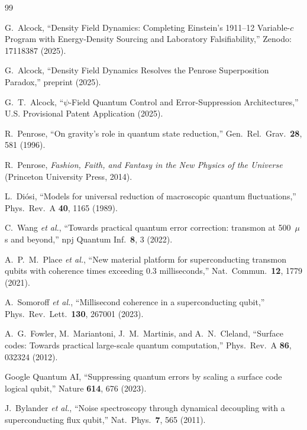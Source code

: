 \documentclass[aps,prd,twocolumn,superscriptaddress,nofootinbib]{revtex4-2}
\begin{document}
\begin{thebibliography}{99}

G.~Alcock, ``Density Field Dynamics: Completing Einstein's 1911--12
Variable-$c$ Program with Energy-Density Sourcing and Laboratory
Falsifiability,'' Zenodo: 17118387 (2025).

G.~Alcock, ``Density Field Dynamics Resolves the Penrose Superposition
Paradox,'' preprint (2025).

G.~T.~Alcock, ``$\psi$-Field Quantum Control and Error-Suppression
Architectures,'' U.S. Provisional Patent Application (2025).

R.~Penrose, ``On gravity's role in quantum state reduction,''
Gen.\ Rel.\ Grav.\ \textbf{28}, 581 (1996).

R.~Penrose, \emph{Fashion, Faith, and Fantasy in the New Physics of
the Universe} (Princeton University Press, 2014).

L.~Di\'osi, ``Models for universal reduction of macroscopic quantum
fluctuations,'' Phys.\ Rev.\ A \textbf{40}, 1165 (1989).

C.~Wang \emph{et al.}, ``Towards practical quantum error correction:
transmon at 500~$\mu$s and beyond,'' npj Quantum Inf.\ \textbf{8},
3 (2022).

A.~P.~M.~Place \emph{et al.}, ``New material platform for
superconducting transmon qubits with coherence times exceeding
0.3 milliseconds,'' Nat.\ Commun.\ \textbf{12}, 1779 (2021).

A.~Somoroff \emph{et al.}, ``Millisecond coherence in a
superconducting qubit,'' Phys.\ Rev.\ Lett.\ \textbf{130},
267001 (2023).

A.~G.~Fowler, M.~Mariantoni, J.~M.~Martinis, and A.~N.~Cleland,
``Surface codes: Towards practical large-scale quantum computation,''
Phys.\ Rev.\ A \textbf{86}, 032324 (2012).

Google Quantum AI, ``Suppressing quantum errors by scaling a surface
code logical qubit,'' Nature \textbf{614}, 676 (2023).

J.~Bylander \emph{et al.}, ``Noise spectroscopy through dynamical
decoupling with a superconducting flux qubit,'' Nat.\ Phys.\
\textbf{7}, 565 (2011).


\end{thebibliography}
\end{document}
